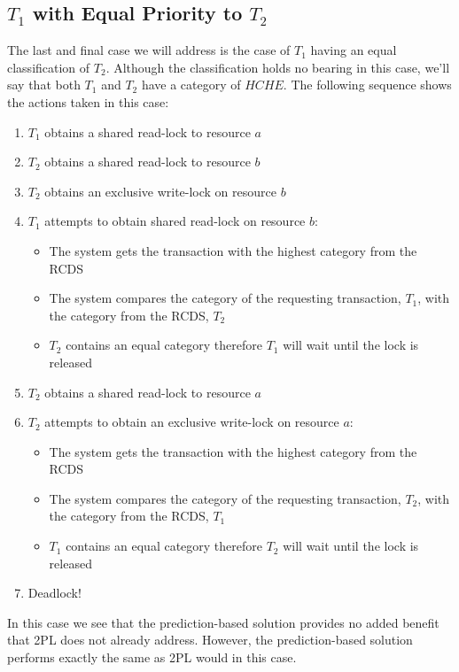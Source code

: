 \subsection{\texorpdfstring{$T_{1}$ with Equal Priority to $T_{2}$}{}}
\label{sec:t1_equal_to_t2}
The last and final case we will address is the case of $T_{1}$ having an equal classification of $T_{2}$. Although the classification holds no bearing in this case, we'll say that both $T_{1}$ and $T_{2}$ have a category of $HCHE$. The following sequence shows the actions taken in this case:

\begin{enumerate}
  \item $T_{1}$ obtains a shared read-lock to resource $a$
  \item $T_{2}$ obtains a shared read-lock to resource $b$
  \item $T_{2}$ obtains an exclusive write-lock on resource $b$
  \item $T_{1}$ attempts to obtain shared read-lock on resource $b$:
    \begin{itemize}
        \item The system gets the transaction with the highest category from the \ac{RCDS}
        \item The system compares the category of the requesting transaction, $T_{1}$, with the category from the \ac{RCDS}, $T_{2}$
        \item $T_{2}$ contains an equal category therefore $T_{1}$ will wait until the lock is released
    \end{itemize}
  \item $T_{2}$ obtains a shared read-lock to resource $a$
  \item $T_{2}$ attempts to obtain an exclusive write-lock on resource $a$:
    \begin{itemize}
        \item The system gets the transaction with the highest category from the \ac{RCDS}
        \item The system compares the category of the requesting transaction, $T_{2}$, with the category from the \ac{RCDS}, $T_{1}$
        \item $T_{1}$ contains an equal category therefore $T_{2}$ will wait until the lock is released
    \end{itemize}    
  \item Deadlock!
\end{enumerate}

In this case we see that the prediction-based solution provides no added benefit that \ac{2PL} does not already address. However, the prediction-based solution performs exactly the same as \ac{2PL} would in this case.

%